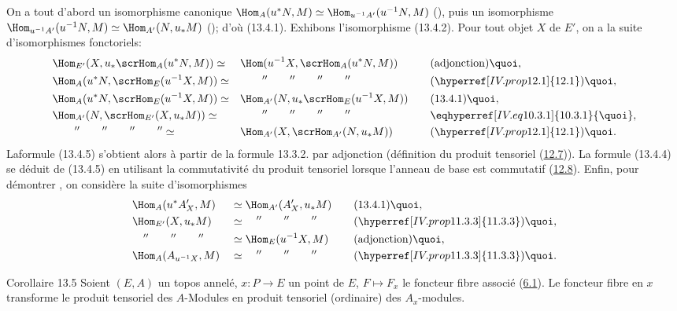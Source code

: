 On a tout d'abord un isomorphisme canonique
$\Hom_A(u^{\ast}N,M)\simeq \Hom_{u^{-1}A'}(u^{-1}N,M)$
(), puis un isomorphisme
$\Hom_{u^{-1}A'}(u^{-1}N,M)\simeq \Hom_{A'}(N,u_{\ast}M)$
(); d'où (13.4.1). Exhibons l'isomorphisme
(13.4.2). Pour tout objet $X$ de $E'$, on a la suite
d'isomorphismes fonctoriels:
\begin{alignat*}{3}
& \Hom_{E'}(X,u_{\ast}\scrHom_A (u^{\ast}N,M))\simeq && \Hom(
u^{-1}X,
 \scrHom_A (u^{\ast}N, M)) &\quad& \text{(adjonction){\quoi},}\\
&\Hom_A(u^{\ast}N,\scrHom_E (u^{-1}X, M)) \simeq &&\qquad ''\qquad ''\qquad
''\qquad '' && (\hyperref[IV.prop12.1]{12.1}){\quoi},\\
& \Hom_A (u^{\ast}N,\scrHom_E(u^{-1}X, M))\simeq &&\Hom_{A'}(N,
u_{\ast} \scrHom_E (u^{-1} X, M)) && (13.4.1){\quoi},\\
& \Hom_{A'}(N,\scrHom_{E'}(X,u_{\ast}M))\simeq &&\qquad ''\qquad  ''\qquad
 ''\qquad '' && \eqhyperref[IV.eq10.3.1]{10.3.1}{\quoi},\\
& \qquad ''\qquad ''\qquad ''\qquad '' \simeq &&
 \Hom_{A'}(X,\scrHom_{A'}(N,u_{\ast}M)) && (\hyperref[IV.prop12.1]{12.1}){\quoi}.
\end{alignat*}
La\pageoriginale formule (13.4.5) s'obtient alors à partir de
la formule 13.3.2. par adjonction (définition du produit tensoriel
(\hyperref[IV.prop12.7]{12.7})). La formule (13.4.4) se déduit de
(13.4.5) en utilisant la commutativité du produit tensoriel
lorsque l'anneau de base est commutatif (\hyperref[IV.subsec12.8]{12.8}).
Enfin, pour démontrer , on considère la suite
d'isomorphismes
\begin{alignat*}{3}
& \Hom_A(u^{\ast}A'_X, M) && \simeq\Hom_{A'}(A'_X, u_{\ast}M)
&\quad&
(13.4.1){\quoi},\\
& \Hom_{E'}(X, u_{\ast}M) && \simeq\quad ''\qquad ''\qquad ''&&
(\hyperref[IV.prop11.3.3]{11.3.3}){\quoi},\\
&\quad ''\qquad ''\qquad ''&& \simeq\Hom_E(u^{-1}X, M) &&
\text{(adjonction)}{\quoi},\\
&\Hom_A(A_{u^{-1}X},M) &&\simeq\quad ''\qquad ''\qquad ''&&
(\hyperref[IV.prop11.3.3]{11.3.3}){\quoi}.
\end{alignat*}

\begin{enonce*}{Corollaire 13.5}
Soient $(E,A)$ un topos annelé, $x:P\rightarrow E$ un point de $E$,
$F\mapsto F_x$ le foncteur fibre associé (\hyperref[IV.def6.1]{6.1}). Le
foncteur fibre en $x$ transforme le produit tensoriel des
$A$-Modules en produit tensoriel (ordinaire) des $A_x$-modules.
\end{enonce*}

